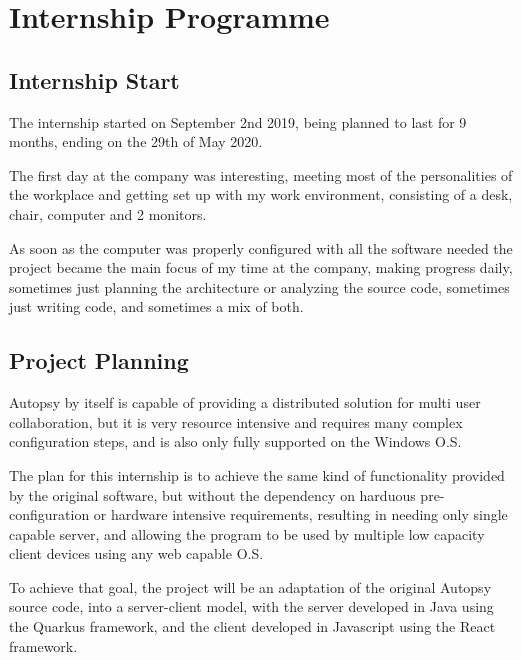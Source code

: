 

\chapter{Internship Programme}
\label{ch:development}

\section{Internship Start}

The internship started on September 2nd 2019, being planned to last for 9 months, ending on the 29th of May 2020.

The first day at the company was interesting, meeting most of the personalities of the workplace and getting set up with my work environment,
consisting of a desk, chair, computer and 2 monitors.

As soon as the computer was properly configured with all the software needed the project became the main focus of my time at the company,
making progress daily, sometimes just planning the architecture or analyzing the source code, sometimes just writing code, and sometimes a mix of both.

\section{Project Planning}

Autopsy by itself is capable of providing a distributed solution for multi user collaboration, but it is very resource intensive and requires many complex configuration steps,
and is also only fully supported on the Windows O.S.

The plan for this internship is to achieve the same kind of functionality provided by the original software, but without the dependency on harduous pre-configuration
or hardware intensive requirements, resulting in needing only single capable server, and allowing the program to be used by multiple low capacity client devices using 
any web capable O.S.

To achieve that goal, the project will be an adaptation of the original Autopsy source code, into a server-client model, with the server developed in Java using the Quarkus framework,
and the client developed in Javascript using the React framework.

